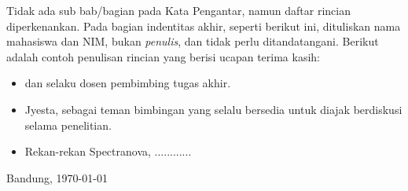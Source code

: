 \newpage
Tidak ada sub bab/bagian pada Kata Pengantar, namun daftar rincian diperkenankan. Pada bagian indentitas akhir, seperti berikut ini, dituliskan nama mahasiswa dan NIM, bukan \textit{penulis}, dan tidak perlu ditandatangani. Berikut adalah contoh penulisan rincian yang berisi ucapan terima kasih:
\begin{itemize}
 \item \pembimbingsatu dan \pembimbingdua selaku dosen pembimbing tugas akhir.
 \item Jyesta, sebagai teman bimbingan yang selalu bersedia untuk diajak berdiskusi selama penelitian.
 \item Rekan-rekan Spectranova, ............
\end{itemize}

\begin{flushright}
Bandung, \today\\[0.25cm]
\penulis \\
\nim
\end{flushright}
